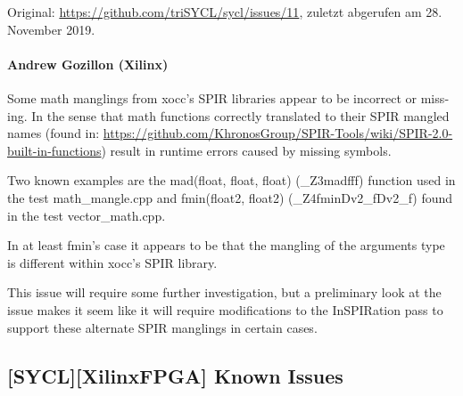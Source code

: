 Original: \url{https://github.com/triSYCL/sycl/issues/11}, zuletzt abgerufen am
28. November 2019.

\begin{otherlanguage}{english}
    \paragraph{Andrew Gozillon (Xilinx)} Some math manglings from xocc's SPIR
                                         libraries appear to be incorrect or
                                         missing. In the sense that math
                                         functions correctly translated to their
                                         SPIR mangled names (found in:
                                         \url{https://github.com/KhronosGroup/SPIR-Tools/wiki/SPIR-2.0-built-in-functions})
                                         result in runtime errors caused by
                                         missing symbols.

                                         Two known examples are the
                                         mad(float, float, float) (\_Z3madfff)
                                         function used in the test
                                         math\_mangle.cpp and
                                         fmin(float2, float2)
                                         (\_Z4fminDv2\_fDv2\_f) found in the 
                                         test vector\_math.cpp.

                                         In at least fmin's case it appears to
                                         be that the mangling of the arguments
                                         type is different within xocc's SPIR
                                         library.

                                         This issue will require some further
                                         investigation, but a preliminary look
                                         at the issue makes it seem like it will
                                         require modifications to the
                                         InSPIRation pass to support these
                                         alternate SPIR manglings in certain
                                         cases.
\end{otherlanguage}

\subsection{[SYCL][XilinxFPGA] Known Issues}
\label{anhang:diskussionen:xilinx:knownissues}

